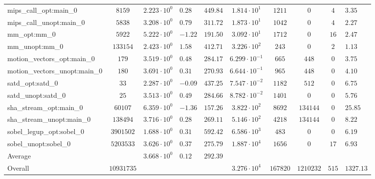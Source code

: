 \begin{tabular}{|l|c|HHc|c|c|c|cH|}
mips\_call\_opt:main\_0                         & $ 8159     $ & $ 2.223 \cdot 10^{0} $ & $ 0.28  $ & $ 449.84 $ & $ 1.814 \cdot 10^{1}  $ & $ 1211   $ & $ 0       $ & $ 4   $ & $ 3.35    $ \\
mips\_call\_unopt:main\_0                       & $ 5838     $ & $ 3.208 \cdot 10^{0} $ & $ 0.79  $ & $ 311.72 $ & $ 1.873 \cdot 10^{1}  $ & $ 1042   $ & $ 0       $ & $ 4   $ & $ 2.27    $ \\
mm\_opt:mm\_0                                   & $ 5922     $ & $ 5.222 \cdot 10^{0} $ & $ -1.22 $ & $ 191.50 $ & $ 3.092 \cdot 10^{1}  $ & $ 1712   $ & $ 0       $ & $ 16  $ & $ 2.47    $ \\
mm\_unopt:mm\_0                                 & $ 133154   $ & $ 2.423 \cdot 10^{0} $ & $ 1.58  $ & $ 412.71 $ & $ 3.226 \cdot 10^{2}  $ & $ 243    $ & $ 0       $ & $ 2   $ & $ 1.13    $ \\
motion\_vectors\_opt:main\_0                    & $ 179      $ & $ 3.519 \cdot 10^{0} $ & $ 0.48  $ & $ 284.17 $ & $ 6.299 \cdot 10^{-1} $ & $ 665    $ & $ 448     $ & $ 0   $ & $ 3.75    $ \\
motion\_vectors\_unopt:main\_0                  & $ 180      $ & $ 3.691 \cdot 10^{0} $ & $ 0.31  $ & $ 270.93 $ & $ 6.644 \cdot 10^{-1} $ & $ 965    $ & $ 448     $ & $ 0   $ & $ 4.10    $ \\
satd\_opt:satd\_0                               & $ 33       $ & $ 2.287 \cdot 10^{0} $ & $ -0.09 $ & $ 437.25 $ & $ 7.547 \cdot 10^{-2} $ & $ 1182   $ & $ 512     $ & $ 0   $ & $ 6.75    $ \\
satd\_unopt:satd\_0                             & $ 25       $ & $ 3.513 \cdot 10^{0} $ & $ 0.49  $ & $ 284.66 $ & $ 8.782 \cdot 10^{-2} $ & $ 1401   $ & $ 0       $ & $ 0   $ & $ 5.76    $ \\
sha\_stream\_opt:main\_0                        & $ 60107    $ & $ 6.359 \cdot 10^{0} $ & $ -1.36 $ & $ 157.26 $ & $ 3.822 \cdot 10^{2}  $ & $ 8692   $ & $ 134144  $ & $ 0   $ & $ 25.85   $ \\
sha\_stream\_unopt:main\_0                      & $ 138494   $ & $ 3.716 \cdot 10^{0} $ & $ 0.28  $ & $ 269.11 $ & $ 5.146 \cdot 10^{2}  $ & $ 4218   $ & $ 134144  $ & $ 0   $ & $ 8.22    $ \\
sobel\_legup\_opt:sobel\_0                      & $ 3901502  $ & $ 1.688 \cdot 10^{0} $ & $ 0.31  $ & $ 592.42 $ & $ 6.586 \cdot 10^{3}  $ & $ 483    $ & $ 0       $ & $ 0   $ & $ 6.19    $ \\
sobel\_unopt:sobel\_0                           & $ 5203533  $ & $ 3.626 \cdot 10^{0} $ & $ 0.37  $ & $ 275.79 $ & $ 1.887 \cdot 10^{4}  $ & $ 1656   $ & $ 0       $ & $ 17  $ & $ 6.93    $ \\
\hline
Average                                         & $          $ & $ 3.668 \cdot 10^{0} $ & $ 0.12  $ & $ 292.39 $ & $                     $ & $        $ & $         $ & $     $ & $         $ \\
\hline
Overall                                         & $ 10931735 $ & $                    $ & $       $ & $        $ & $ 3.276 \cdot 10^{4}  $ & $ 167820 $ & $ 1210232 $ & $ 515 $ & $ 1327.13 $ \\
\hline
\end{tabular}
